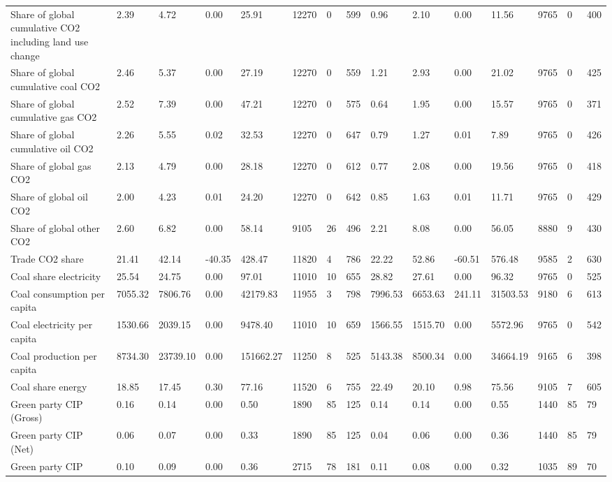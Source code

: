 \begin{longtable}{lllllllllllllll}
Share of global cumulative CO2 including land use change & 2.39 & 4.72 & 0.00 & 25.91 & 12270 & 0 & 599 & 0.96 & 2.10 & 0.00 & 11.56 & 9765 & 0 & 400\\
Share of global cumulative coal CO2 & 2.46 & 5.37 & 0.00 & 27.19 & 12270 & 0 & 559 & 1.21 & 2.93 & 0.00 & 21.02 & 9765 & 0 & 425\\
Share of global cumulative gas CO2 & 2.52 & 7.39 & 0.00 & 47.21 & 12270 & 0 & 575 & 0.64 & 1.95 & 0.00 & 15.57 & 9765 & 0 & 371\\
\addlinespace
Share of global cumulative oil CO2 & 2.26 & 5.55 & 0.02 & 32.53 & 12270 & 0 & 647 & 0.79 & 1.27 & 0.01 & 7.89 & 9765 & 0 & 426\\
Share of global gas CO2 & 2.13 & 4.79 & 0.00 & 28.18 & 12270 & 0 & 612 & 0.77 & 2.08 & 0.00 & 19.56 & 9765 & 0 & 418\\
Share of global oil CO2 & 2.00 & 4.23 & 0.01 & 24.20 & 12270 & 0 & 642 & 0.85 & 1.63 & 0.01 & 11.71 & 9765 & 0 & 429\\
Share of global other CO2 & 2.60 & 6.82 & 0.00 & 58.14 & 9105 & 26 & 496 & 2.21 & 8.08 & 0.00 & 56.05 & 8880 & 9 & 430\\
Trade CO2 share & 21.41 & 42.14 & -40.35 & 428.47 & 11820 & 4 & 786 & 22.22 & 52.86 & -60.51 & 576.48 & 9585 & 2 & 630\\
\addlinespace
Coal share electricity & 25.54 & 24.75 & 0.00 & 97.01 & 11010 & 10 & 655 & 28.82 & 27.61 & 0.00 & 96.32 & 9765 & 0 & 525\\
Coal consumption per capita & 7055.32 & 7806.76 & 0.00 & 42179.83 & 11955 & 3 & 798 & 7996.53 & 6653.63 & 241.11 & 31503.53 & 9180 & 6 & 613\\
Coal electricity per capita & 1530.66 & 2039.15 & 0.00 & 9478.40 & 11010 & 10 & 659 & 1566.55 & 1515.70 & 0.00 & 5572.96 & 9765 & 0 & 542\\
Coal production per capita & 8734.30 & 23739.10 & 0.00 & 151662.27 & 11250 & 8 & 525 & 5143.38 & 8500.34 & 0.00 & 34664.19 & 9165 & 6 & 398\\
Coal share energy & 18.85 & 17.45 & 0.30 & 77.16 & 11520 & 6 & 755 & 22.49 & 20.10 & 0.98 & 75.56 & 9105 & 7 & 605\\
\addlinespace
Green party CIP (Gross) & 0.16 & 0.14 & 0.00 & 0.50 & 1890 & 85 & 125 & 0.14 & 0.14 & 0.00 & 0.55 & 1440 & 85 & 79\\
Green party CIP (Net) & 0.06 & 0.07 & 0.00 & 0.33 & 1890 & 85 & 125 & 0.04 & 0.06 & 0.00 & 0.36 & 1440 & 85 & 79\\
Green party CIP & 0.10 & 0.09 & 0.00 & 0.36 & 2715 & 78 & 181 & 0.11 & 0.08 & 0.00 & 0.32 & 1035 & 89 & 70\\

\end{longtable}

